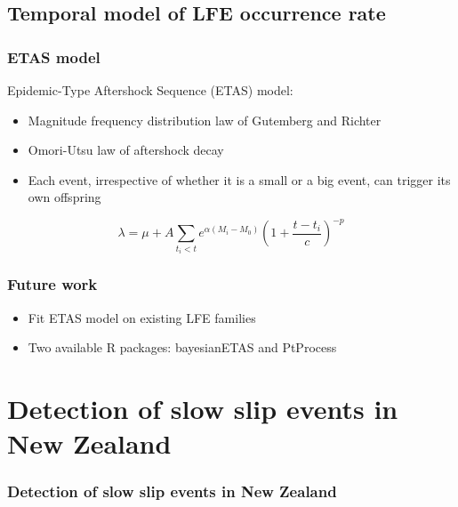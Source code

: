 \documentclass{beamer}
\begin{document}
	\subsection{Temporal model of LFE occurrence rate}

	\begin{frame}
		\frametitle{ETAS model}
		Epidemic-Type Aftershock Sequence (ETAS) model:
		\begin{itemize}
			\item Magnitude frequency distribution law of Gutemberg and Richter
			\item Omori-Utsu law of aftershock decay
			\item Each event, irrespective of whether it is a small or a big event, can trigger its own offspring
		\end{itemize}
		\begin{equation*}
		\lambda = \mu + A \sum_{t_i < t} e^{\alpha \left( M_i - M_0 \right)} \left( 1 + \frac{t - t_i}{c} \right) ^{-p}
		\end{equation*}
	\end{frame}

	\begin{frame}
		\frametitle{Future work}
		\begin{itemize}
			\item Fit ETAS model on existing LFE families
			\item Two available R packages: bayesianETAS and PtProcess
		\end{itemize}
	\end{frame}
		

	\section{Detection of slow slip events in New Zealand}

	\begin{frame}
		\frametitle{Detection of slow slip events in New Zealand}
	\end{frame}
\end{document}

